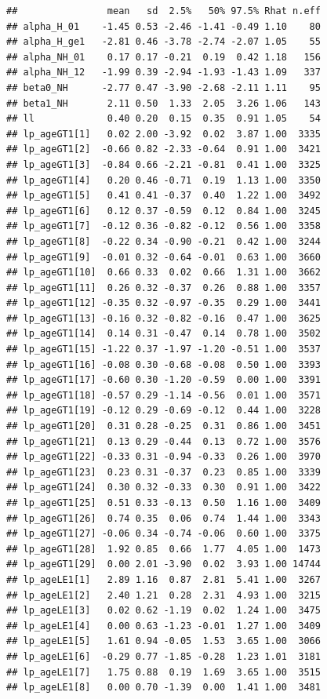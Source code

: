 \documentclass[
  12pt,
]{krantz}
\begin{document}
\begin{verbatim}
##                mean   sd  2.5%   50% 97.5% Rhat n.eff
## alpha_H_01    -1.45 0.53 -2.46 -1.41 -0.49 1.10    80
## alpha_H_ge1   -2.81 0.46 -3.78 -2.74 -2.07 1.05    55
## alpha_NH_01    0.17 0.17 -0.21  0.19  0.42 1.18   156
## alpha_NH_12   -1.99 0.39 -2.94 -1.93 -1.43 1.09   337
## beta0_NH      -2.77 0.47 -3.90 -2.68 -2.11 1.11    95
## beta1_NH       2.11 0.50  1.33  2.05  3.26 1.06   143
## ll             0.40 0.20  0.15  0.35  0.91 1.05    54
## lp_ageGT1[1]   0.02 2.00 -3.92  0.02  3.87 1.00  3335
## lp_ageGT1[2]  -0.66 0.82 -2.33 -0.64  0.91 1.00  3421
## lp_ageGT1[3]  -0.84 0.66 -2.21 -0.81  0.41 1.00  3325
## lp_ageGT1[4]   0.20 0.46 -0.71  0.19  1.13 1.00  3350
## lp_ageGT1[5]   0.41 0.41 -0.37  0.40  1.22 1.00  3492
## lp_ageGT1[6]   0.12 0.37 -0.59  0.12  0.84 1.00  3245
## lp_ageGT1[7]  -0.12 0.36 -0.82 -0.12  0.56 1.00  3358
## lp_ageGT1[8]  -0.22 0.34 -0.90 -0.21  0.42 1.00  3244
## lp_ageGT1[9]  -0.01 0.32 -0.64 -0.01  0.63 1.00  3660
## lp_ageGT1[10]  0.66 0.33  0.02  0.66  1.31 1.00  3662
## lp_ageGT1[11]  0.26 0.32 -0.37  0.26  0.88 1.00  3357
## lp_ageGT1[12] -0.35 0.32 -0.97 -0.35  0.29 1.00  3441
## lp_ageGT1[13] -0.16 0.32 -0.82 -0.16  0.47 1.00  3625
## lp_ageGT1[14]  0.14 0.31 -0.47  0.14  0.78 1.00  3502
## lp_ageGT1[15] -1.22 0.37 -1.97 -1.20 -0.51 1.00  3537
## lp_ageGT1[16] -0.08 0.30 -0.68 -0.08  0.50 1.00  3393
## lp_ageGT1[17] -0.60 0.30 -1.20 -0.59  0.00 1.00  3391
## lp_ageGT1[18] -0.57 0.29 -1.14 -0.56  0.01 1.00  3571
## lp_ageGT1[19] -0.12 0.29 -0.69 -0.12  0.44 1.00  3228
## lp_ageGT1[20]  0.31 0.28 -0.25  0.31  0.86 1.00  3451
## lp_ageGT1[21]  0.13 0.29 -0.44  0.13  0.72 1.00  3576
## lp_ageGT1[22] -0.33 0.31 -0.94 -0.33  0.26 1.00  3970
## lp_ageGT1[23]  0.23 0.31 -0.37  0.23  0.85 1.00  3339
## lp_ageGT1[24]  0.30 0.32 -0.33  0.30  0.91 1.00  3422
## lp_ageGT1[25]  0.51 0.33 -0.13  0.50  1.16 1.00  3409
## lp_ageGT1[26]  0.74 0.35  0.06  0.74  1.44 1.00  3343
## lp_ageGT1[27] -0.06 0.34 -0.74 -0.06  0.60 1.00  3375
## lp_ageGT1[28]  1.92 0.85  0.66  1.77  4.05 1.00  1473
## lp_ageGT1[29]  0.00 2.01 -3.90  0.02  3.93 1.00 14744
## lp_ageLE1[1]   2.89 1.16  0.87  2.81  5.41 1.00  3267
## lp_ageLE1[2]   2.40 1.21  0.28  2.31  4.93 1.00  3215
## lp_ageLE1[3]   0.02 0.62 -1.19  0.02  1.24 1.00  3475
## lp_ageLE1[4]   0.00 0.63 -1.23 -0.01  1.27 1.00  3409
## lp_ageLE1[5]   1.61 0.94 -0.05  1.53  3.65 1.00  3066
## lp_ageLE1[6]  -0.29 0.77 -1.85 -0.28  1.23 1.01  3181
## lp_ageLE1[7]   1.75 0.88  0.19  1.69  3.65 1.00  3515
## lp_ageLE1[8]   0.00 0.70 -1.39  0.00  1.41 1.00  3481

\end{verbatim}
\end{document}

